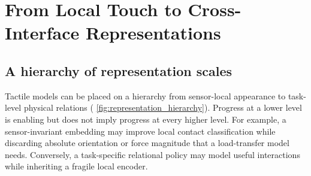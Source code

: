 \section{From Local Touch to Cross-Interface Representations}
\label{sec:representations}

\subsection{A hierarchy of representation scales}

Tactile models can be placed on a hierarchy from sensor-local appearance to
task-level physical relations (
\cref{fig:representation_hierarchy}). Progress at a lower level is enabling but
does not imply progress at every higher level. For example, a sensor-invariant
embedding may improve local contact classification while discarding absolute
orientation or force magnitude that a load-transfer model needs. Conversely, a
task-specific relational policy may model useful interactions while inheriting a
fragile local encoder.

